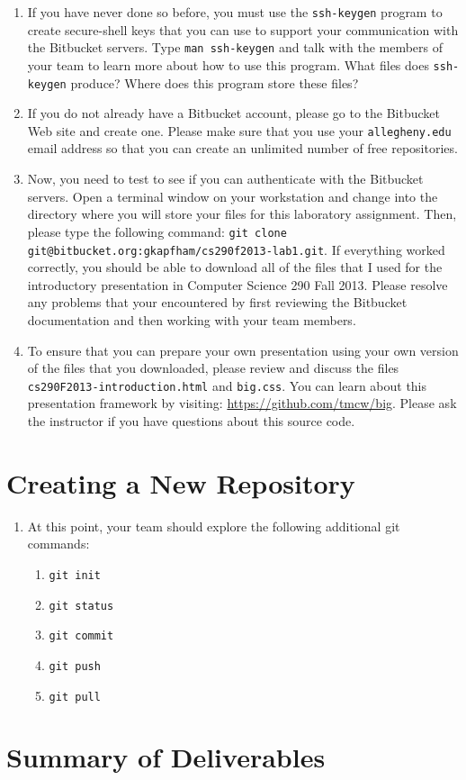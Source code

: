 \begin{enumerate}
	\item If you have never done so before, you must use the {\tt ssh-keygen} program to create secure-shell keys that
		you can use to support your communication with the Bitbucket servers.  Type {\tt man ssh-keygen} and talk with
		the members of your team to learn more about how to use this program.  What files does {\tt ssh-keygen} produce? 
		Where does this program store these files?

	\item If you do not already have a Bitbucket account, please go to the Bitbucket Web site and create one.  Please
		make sure that you use your {\tt allegheny.edu} email address so that you can create an unlimited number of free
		repositories.

	\item Now, you need to test to see if you can authenticate with the Bitbucket servers.  Open a terminal window on
		your workstation and change into the directory where you will store your files for this laboratory assignment.
		Then, please type the following command: {\tt git clone git@bitbucket.org:gkapfham/cs290f2013-lab1.git}.  If
		everything worked correctly, you should be able to download all of the files that I used for the introductory
		presentation in Computer Science 290 Fall 2013. Please resolve any problems that your encountered by first
		reviewing the Bitbucket documentation and then working with your team members.

	\item To ensure that you can prepare your own presentation using your own version of the files that you downloaded, please review
		and discuss the files {\tt cs290F2013-introduction.html} and {\tt big.css}. You can learn about this
		presentation framework by visiting: \url{https://github.com/tmcw/big}. Please ask the instructor if you have
		questions about this source code.

\end{enumerate}

\section*{Creating a New Repository}

\begin{enumerate}

	\item At this point, your team should explore the following additional git commands:

		\begin{enumerate}
			\item {\tt git init}

			\item {\tt git status}

			\item {\tt git commit}

			\item {\tt git push}

			\item {\tt git pull}
		\end{enumerate}

\end{enumerate} 

\section*{Summary of Deliverables}


